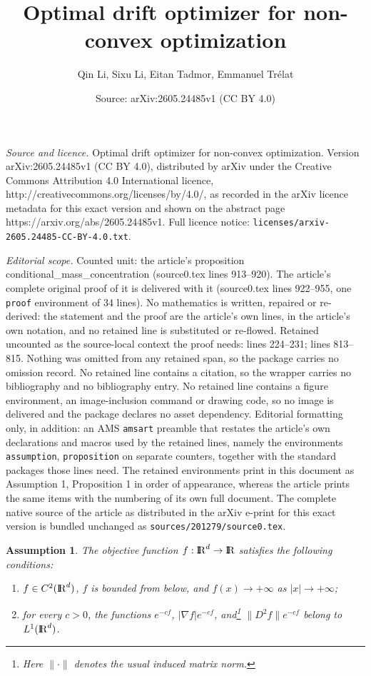 \documentclass[10pt,a4paper]{amsart}
\title{Optimal drift optimizer for non-convex optimization}
\author{Qin Li, Sixu Li, Eitan Tadmor, Emmanuel Tr\'{e}lat}
\date{Source: arXiv:2605.24485v1 (CC BY 4.0)}
\newtheorem{assumption}{Assumption}
\def\R{\mathrm{I\kern-0.21emR}}
\renewcommand{\Vert}{|}
\begin{document}
\maketitle

\noindent\emph{Source and licence.} Optimal drift optimizer for non-convex optimization. Version arXiv:2605.24485v1 (CC BY 4.0), distributed by arXiv under the Creative Commons Attribution 4.0 International licence, http://creativecommons.org/licenses/by/4.0/, as recorded in the arXiv licence metadata for this exact version and shown on the abstract page https://arxiv.org/abs/2605.24485v1. Full licence notice: \texttt{licenses/arxiv-2605.24485-CC-BY-4.0.txt}.\par\smallskip

\noindent\textit{Editorial scope.} Counted unit: the article's proposition conditional\_mass\_concentration (source0.tex lines 913--920). The article's complete original proof of it is delivered with it (source0.tex lines 922--955, one \texttt{proof} environment of 34 lines). No mathematics is written, repaired or re-derived: the statement and the proof are the article's own lines, in the article's own notation, and no retained line is substituted or re-flowed.  Retained uncounted as the source-local context the proof needs: lines 224--231; lines 813--815.  Nothing was omitted from any retained span, so the package carries no omission record.  No retained line contains a citation, so the wrapper carries no bibliography and no bibliography entry.  No retained line contains a figure environment, an image-inclusion command or drawing code, so no image is delivered and the package declares no asset dependency.  Editorial formatting only, in addition: an AMS \texttt{amsart} preamble that restates the article's own declarations and macros used by the retained lines, namely the environments \texttt{assumption}, \texttt{proposition} on separate counters, together with the standard packages those lines need.  The retained environments print in this document as Assumption 1, Proposition 1 in order of appearance, whereas the article prints the same items with the numbering of its own full document.  The complete native source of the article as distributed in the arXiv e-print for this exact version is bundled unchanged as \texttt{sources/201279/source0.tex}.
\begin{assumption}\label{basic_ass}
The objective function $f : \R^d \to \R$ satisfies the following conditions:
\begin{enumerate}[label=\roman*)]
\item $f \in C^2(\R^d)$, $f$ is bounded from below, and $f(x) \to +\infty$ as $\Vert x \Vert \to +\infty$;
\item for every $c > 0$, the functions $e^{-cf}$, $\Vert \nabla f \Vert e^{-cf}$, and\footnote{Here $\| \cdot \|$ denotes the usual induced matrix norm.} $\| D^2 f \| e^{-cf}$ belong to $L^1(\R^d)$.
\end{enumerate}

\end{assumption}
\end{document}
